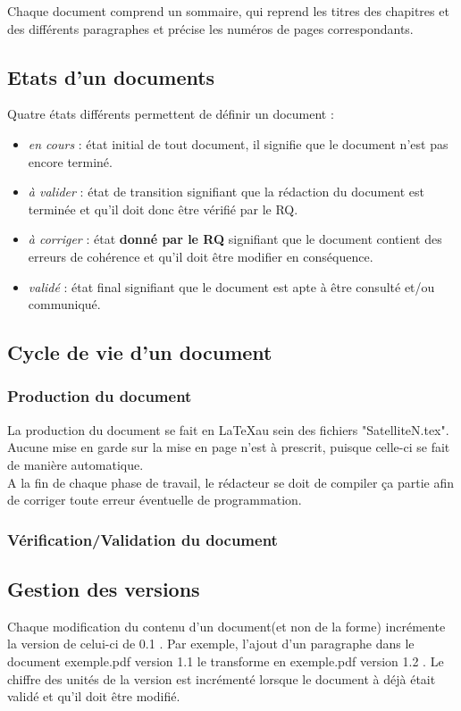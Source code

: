       Chaque document comprend un sommaire, qui reprend les titres des chapitres et des différents paragraphes et précise les numéros de pages correspondants.
  
   
  \subsection{Etats d'un documents}
  
    Quatre états différents permettent de définir un document :
    \begin{itemize}
      \item \textit{en cours} : état initial de tout document, il signifie que le document n'est pas encore terminé.
      \item \textit{à valider} : état de transition signifiant que la rédaction du document est terminée et qu'il doit donc être vérifié par le RQ.
      \item \textit{à corriger} : état \textbf{donné par le RQ} signifiant que le document contient des erreurs de cohérence et qu'il doit être modifier en conséquence.
      \item \textit{validé} : état final signifiant que le document est apte à être consulté et/ou communiqué.
    \end{itemize}
  
  \subsection{Cycle de vie d'un document}
    \subsubsection{Production du document}
      La production du document se fait en \LaTeX au sein des fichiers "SatelliteN.tex".\\ Aucune mise en garde sur la mise en page n'est à
      prescrit, puisque celle-ci se fait de manière automatique.\\ A la fin de chaque phase de travail, le rédacteur se doit de compiler ça partie
      afin de corriger toute erreur éventuelle de programmation.
    \subsubsection{Vérification/Validation du document}
    
  \subsection{Gestion des versions}
     Chaque modification du contenu d'un document(et non de la forme) incrémente la version de celui-ci de 0.1 . Par exemple, l'ajout d'un paragraphe dans le document exemple.pdf version 1.1 le transforme en exemple.pdf version 1.2 . Le chiffre des unités de la version est incrémenté lorsque le document à déjà était validé et qu'il doit être modifié.
     
